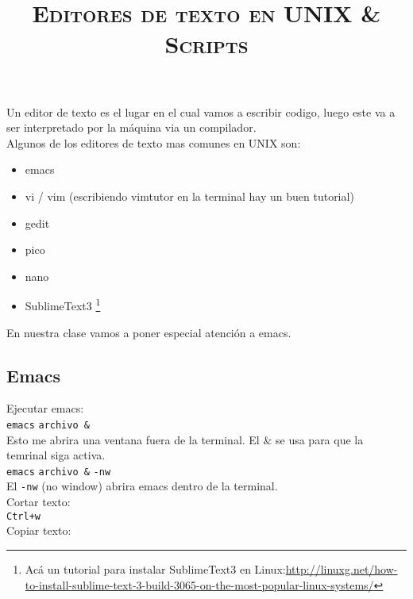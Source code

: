 \documentclass[12pt]{article}
\title{\textsc{Editores de texto en UNIX \& Scripts} }
\begin{document}
\date{}
\maketitle

Un editor de texto es el lugar en el cual vamos a escribir codigo, luego este va a ser interpretado 
por la m\'aquina via un compilador.\\

Algunos de los editores de texto mas comunes en UNIX son:

\begin{itemize}
\item emacs
\item vi / vim (escribiendo vimtutor en la terminal hay un buen tutorial)
\item gedit
\item pico 
\item nano 
\item SublimeText3 \footnote{Acá un tutorial para instalar SublimeText3 en Linux:\newline \url{http://linuxg.net/how-to-install-sublime-text-3-build-3065-on-the-most-popular-linux-systems/}}
\end{itemize}

En nuestra clase vamos a poner especial atenci\'on a emacs.

\begin{center}
\section*{Emacs}
\end{center}

Ejecutar emacs:\\

\texttt{emacs} \verb"archivo &"  \\

Esto me abrira una ventana fuera de la terminal. El $\&$ se usa para que la temrinal siga activa.\\

\texttt{emacs} \verb"archivo &" \texttt{-nw}  \\

El \texttt{-nw} (no window) abrira emacs dentro de la terminal.\\

Cortar texto:\\

\texttt{Ctrl+w}\\

Copiar texto:\\
\end{document}
